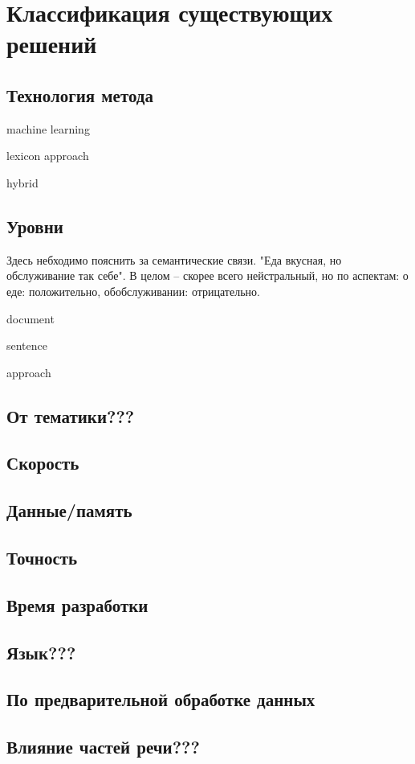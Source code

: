 \chapter{Классификация существующих решений}

\section{Технология метода}
machine learning

lexicon approach

hybrid

\section{Уровни}

Здесь небходимо пояснить за семантические связи. "Еда вкусная, но
обслуживание так себе". В целом -- скорее всего нейстральный, но по аспектам:
о еде: положительно, обобслуживании: отрицательно.

document

sentence

approach

\section{От тематики???}

\section{Скорость}

\section{Данные/память}

\section{Точность}

\section{Время разработки}

\section{Язык???}

\section{По предварительной обработке данных}

\section{Влияние частей речи???}
